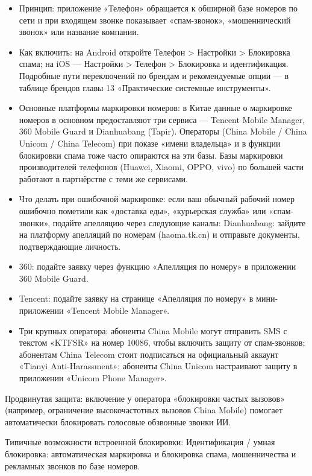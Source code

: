 
\begin{itemize}
  \item Принцип: приложение «Телефон» обращается к обширной базе номеров по сети и при входящем звонке показывает «спам-звонок», «мошеннический звонок» или название компании.
  \item Как включить: на Android откройте Телефон > Настройки > Блокировка спама; на iOS — Настройки > Телефон > Блокировка и идентификация. Подробные пути переключений по брендам и рекомендуемые опции — в таблице брендов главы 13 «Практические системные инструменты».
  \item Основные платформы маркировки номеров: в Китае данные о маркировке номеров в основном предоставляют три сервиса — Tencent Mobile Manager, 360 Mobile Guard и Dianhuabang (Tapir). Операторы (China Mobile / China Unicom / China Telecom) при показе «имени владельца» и в функции блокировки спама тоже часто опираются на эти базы. Базы маркировки производителей телефонов (Huawei, Xiaomi, OPPO, vivo) по большей части работают в партнёрстве с теми же сервисами.
  \item Что делать при ошибочной маркировке: если ваш обычный рабочий номер ошибочно пометили как «доставка еды», «курьерская служба» или «спам-звонки», подайте апелляцию через следующие каналы: Dianhuabang: зайдите на платформу апелляций по номерам (haoma.tk.cn) и отправьте документы, подтверждающие личность.
  \item 360: подайте заявку через функцию «Апелляция по номеру» в приложении 360 Mobile Guard.
  \item Tencent: подайте заявку на странице «Апелляция по номеру» в мини-приложении «Tencent Mobile Manager».
  \item Три крупных оператора: абоненты China Mobile могут отправить SMS с текстом «KTFSR» на номер 10086, чтобы включить защиту от спам-звонков; абонентам China Telecom стоит подписаться на официальный аккаунт «Tianyi Anti-Harassment»; абоненты China Unicom настраивают защиту в приложении «Unicom Phone Manager».
\end{itemize}

Продвинутая защита: включение у оператора «блокировки частых вызовов» (например, ограничение высокочастотных вызовов China Mobile) помогает автоматически блокировать голосовые обзвонные звонки ИИ.

Типичные возможности встроенной блокировки: Идентификация / умная блокировка: автоматическая маркировка и блокировка спама, мошенничества и рекламных звонков по базе номеров.

